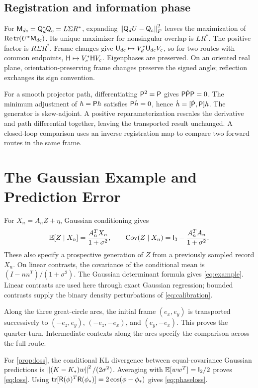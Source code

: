 \subsection{Registration and information phase}
For \(\mathsf M_{dc}=\mathsf Q_d^*\mathsf Q_c=L\Sigma R^*\), expanding \(\left\lVert\mathsf Q_dU-\mathsf Q_c\right\rVert_F^2\) leaves the maximization of \(\operatorname{Re}\operatorname{tr}(U^*\mathsf M_{dc})\). Its unique maximizer for nonsingular overlap is \(LR^*\). The positive factor is \(R\Sigma R^*\). Frame changes give \(\mathsf U_{dc}\mapsto V_d^*\mathsf U_{dc}V_c\), so for two routes with common endpoints, \(\mathsf H\mapsto V_c^*\mathsf H V_c\). Eigenphases are preserved. On an oriented real plane, orientation-preserving frame changes preserve the signed angle; reflection exchanges its sign convention.

For a smooth projector path, differentiating \(\mathsf P^2=\mathsf P\) gives \(\mathsf P\dot{\mathsf P}\mathsf P=0\). The minimum adjustment of \(h=\mathsf P h\) satisfies \(\mathsf P\dot h=0\), hence \(\dot h=[\dot{\mathsf P},\mathsf P]h\). The generator is skew-adjoint. A positive reparameterization rescales the derivative and path differential together, leaving the transported result unchanged. A closed-loop comparison uses an inverse registration map to compare two forward routes in the same frame.

\section{The Gaussian Example and Prediction Error}
\label{app:example}
For \(X_n=A_nZ+\eta\), Gaussian conditioning gives
\begin{equation*}
\mathbb E[Z\mid X_n]=\frac{A_n^TX_n}{1+\sigma^2},\qquad
\operatorname{Cov}(Z\mid X_n)=\mathsf I_3-\frac{A_n^TA_n}{1+\sigma^2}.
\end{equation*}
These also specify a prospective generation of \(Z\) from a previously sampled record \(X_n\). On linear contrasts, the covariance of the conditional mean is \((I-nn^T)/(1+\sigma^2)\). The Gaussian determinant formula gives \cref{eq:example}. Linear contrasts are used here through exact Gaussian regression; bounded contrasts supply the binary density perturbations of \cref{eq:calibration}.

Along the three great-circle arcs, the initial frame \((e_x,e_y)\) is transported successively to \((-e_z,e_y)\), \((-e_z,-e_x)\), and \((e_y,-e_x)\). This proves the quarter-turn. Intermediate contexts along the arcs specify the comparison across the full route.

For \cref{prop:loss}, the conditional KL divergence between equal-covariance Gaussian predictions is \(\left\lVert(K-K_*)w\right\rVert^2/(2\sigma^2)\). Averaging with \(\mathbb E[ww^T]=\mathsf I_2/2\) proves \cref{eq:loss}. Using \(\operatorname{tr}[\mathsf R(\phi)^T\mathsf R(\phi_*)]=2\cos(\phi-\phi_*)\) gives \cref{eq:phaseloss}.

